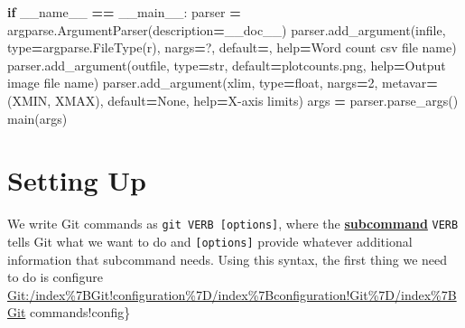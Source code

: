 \documentclass[
]{krantz}
\makeatletter
\newenvironment{Shaded}{\begin{snugshade}}{\end{snugshade}}
\newcommand{\BuiltInTok}[1]{#1}
\newcommand{\ControlFlowTok}[1]{\textcolor[rgb]{0.13,0.29,0.53}{\textbf{#1}}}
\newcommand{\DecValTok}[1]{\textcolor[rgb]{0.00,0.00,0.81}{#1}}
\newcommand{\NormalTok}[1]{#1}
\newcommand{\OperatorTok}[1]{\textcolor[rgb]{0.81,0.36,0.00}{\textbf{#1}}}
\newcommand{\StringTok}[1]{\textcolor[rgb]{0.31,0.60,0.02}{#1}}
\newcommand{\VariableTok}[1]{\textcolor[rgb]{0.00,0.00,0.00}{#1}}
\newenvironment{kframe}{%
\medskip{}
\setlength{\fboxsep}{.8em}
 \def\at@end@of@kframe{}%
 \ifinner\ifhmode%
  \def\at@end@of@kframe{\end{minipage}}%
  \begin{minipage}{\columnwidth}%
 \fi\fi%
 \def\FrameCommand##1{\hskip\@totalleftmargin \hskip-\fboxsep
 \colorbox{shadecolor}{##1}\hskip-\fboxsep
     \hskip-\linewidth \hskip-\@totalleftmargin \hskip\columnwidth}%
 \MakeFramed {\advance\hsize-\width
   \@totalleftmargin\z@ \linewidth\hsize
   \@setminipage}}%
 {\par\unskip\endMakeFramed%
 \at@end@of@kframe}
\renewenvironment{Shaded}{\begin{kframe}}{\end{kframe}}
\newcommand{\gref}[2]{\hyperlink{#2}{\textbf{#1}}}
\makeatother
\begin{document}
\begin{Shaded}
\begin{Highlighting}[]
\ControlFlowTok{if} \VariableTok{\_\_name\_\_} \OperatorTok{==} \StringTok{\textquotesingle{}\_\_main\_\_\textquotesingle{}}\NormalTok{:}
\NormalTok{    parser }\OperatorTok{=}\NormalTok{ argparse.ArgumentParser(description}\OperatorTok{=}\NormalTok{\_\_doc\_\_)}
\NormalTok{    parser.add\_argument(}\StringTok{\textquotesingle{}infile\textquotesingle{}}\NormalTok{, }\BuiltInTok{type}\OperatorTok{=}\NormalTok{argparse.FileType(}\StringTok{\textquotesingle{}r\textquotesingle{}}\NormalTok{), nargs}\OperatorTok{=}\StringTok{\textquotesingle{}?\textquotesingle{}}\NormalTok{,}
\NormalTok{                        default}\OperatorTok{=}\StringTok{\textquotesingle{}{-}\textquotesingle{}}\NormalTok{, }\BuiltInTok{help}\OperatorTok{=}\StringTok{\textquotesingle{}Word count csv file name\textquotesingle{}}\NormalTok{)}
\NormalTok{    parser.add\_argument(}\StringTok{\textquotesingle{}{-}{-}outfile\textquotesingle{}}\NormalTok{, }\BuiltInTok{type}\OperatorTok{=}\BuiltInTok{str}\NormalTok{, default}\OperatorTok{=}\StringTok{\textquotesingle{}plotcounts.png\textquotesingle{}}\NormalTok{,}
                        \BuiltInTok{help}\OperatorTok{=}\StringTok{\textquotesingle{}Output image file name\textquotesingle{}}\NormalTok{)}
\NormalTok{    parser.add\_argument(}\StringTok{\textquotesingle{}{-}{-}xlim\textquotesingle{}}\NormalTok{, }\BuiltInTok{type}\OperatorTok{=}\BuiltInTok{float}\NormalTok{, nargs}\OperatorTok{=}\DecValTok{2}\NormalTok{, metavar}\OperatorTok{=}\NormalTok{(}\StringTok{\textquotesingle{}XMIN\textquotesingle{}}\NormalTok{, }\StringTok{\textquotesingle{}XMAX\textquotesingle{}}\NormalTok{),}
\NormalTok{                        default}\OperatorTok{=}\VariableTok{None}\NormalTok{, }\BuiltInTok{help}\OperatorTok{=}\StringTok{\textquotesingle{}X{-}axis limits\textquotesingle{}}\NormalTok{)}
\NormalTok{    args }\OperatorTok{=}\NormalTok{ parser.parse\_args()}
\NormalTok{    main(args)}
\end{Highlighting}
\end{Shaded}

\hypertarget{git-cmdline-setup}{%
\section{Setting Up}\label{git-cmdline-setup}}

We write Git commands as \texttt{git\ VERB\ {[}options{]}},
where the \gref{subcommand}{subcommand} \texttt{VERB} tells Git what we want to do
and \texttt{{[}options{]}} provide whatever additional information that subcommand needs.
Using this syntax,
the first thing we need to do is configure \url{Git:/index\%7BGit!configuration\%7D/index\%7Bconfiguration!Git\%7D/index\%7BGit} commands!config\}
\end{document}
